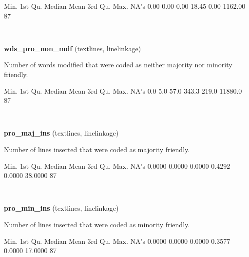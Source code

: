 \documentclass[]{article}
\newenvironment{Shaded}{\begin{snugshade}}{\end{snugshade}}
\newcommand{\StringTok}[1]{\textcolor[rgb]{0.31,0.60,0.02}{{#1}}}
\newcommand{\NormalTok}[1]{{#1}}
\begin{document}
\begin{Shaded}
\begin{Highlighting}[]
   \NormalTok{Min. 1st Qu.  Median    Mean 3rd Qu.    Max.    NA}\StringTok{'s }
\StringTok{   0.00    0.00    0.00   18.45    0.00 1162.00      87 }
\end{Highlighting}
\end{Shaded}

~

\vspace{1em}

\textbf{wds\_pro\_non\_mdf} (textlines, linelinkage)

Number of words modified that were coded as neither majority nor
minority friendly.

\begin{Shaded}
\begin{Highlighting}[]
   \NormalTok{Min. 1st Qu.  Median    Mean 3rd Qu.    Max.    NA}\StringTok{'s }
\StringTok{    0.0     5.0    57.0   343.3   219.0 11880.0      87 }
\end{Highlighting}
\end{Shaded}

~

\vspace{1em}

\textbf{pro\_maj\_ins} (textlines, linelinkage)

Number of lines inserted that were coded as majority friendly.

\begin{Shaded}
\begin{Highlighting}[]
   \NormalTok{Min. 1st Qu.  Median    Mean 3rd Qu.    Max.    NA}\StringTok{'s }
\StringTok{ 0.0000  0.0000  0.0000  0.4292  0.0000 38.0000      87 }
\end{Highlighting}
\end{Shaded}

~

\vspace{1em}

\textbf{pro\_min\_ins} (textlines, linelinkage)

Number of lines inserted that were coded as minority friendly.

\begin{Shaded}
\begin{Highlighting}[]
   \NormalTok{Min. 1st Qu.  Median    Mean 3rd Qu.    Max.    NA}\StringTok{'s }
\StringTok{ 0.0000  0.0000  0.0000  0.3577  0.0000 17.0000      87 }
\end{Highlighting}
\end{Shaded}
\end{document}
